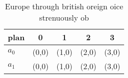 \documentclass[a4paper]{article}
\begin{document}
\begin{table}
\begin{adjustbox}{width=0.7\columnwidth}
\begin{tabular}{|l|l|l|l|l|}
\hline
\textbf{plan} & \multicolumn{1}{c|}{\textbf{0}} & \multicolumn{1}{c|}{\textbf{1}} & \multicolumn{1}{c|}{\textbf{2}} & \multicolumn{1}{c|}{\textbf{3}} \\ \hline
\textbf{$a_0$}  & (0,0) & (1,0) & (2,0) & (3,0) \\ \hline
\textbf{$a_1$}  & (0,0) & (1,0) & (2,0) & (3,0) \\ \hline
\end{tabular}
\end{adjustbox}
\caption{Europe through british oreign oice strenuously ob
}
\end{table}
\end{document}
